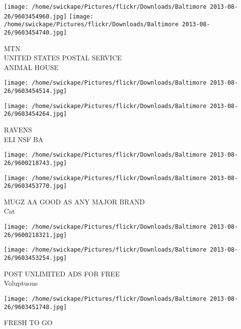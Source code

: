\documentclass[10pt,letterpaper]{article}
\begin{document}
\vspace{0.25in}
\texttt{[image: /home/swickape/Pictures/flickr/Downloads/Baltimore 2013-08-26/9603454960.jpg]}
\texttt{[image: /home/swickape/Pictures/flickr/Downloads/Baltimore 2013-08-26/9603454740.jpg]}

MTN\\
UNITED STATES POSTAL SERVICE\\
ANIMAL HOUSE\\
\pagebreak

\texttt{[image: /home/swickape/Pictures/flickr/Downloads/Baltimore 2013-08-26/9603454514.jpg]}

\vspace{0.25in}
\texttt{[image: /home/swickape/Pictures/flickr/Downloads/Baltimore 2013-08-26/9603454264.jpg]}

RAVENS\\
ELI NSF BA\\
\pagebreak

\texttt{[image: /home/swickape/Pictures/flickr/Downloads/Baltimore 2013-08-26/9600218743.jpg]}

\vspace{0.25in}
\texttt{[image: /home/swickape/Pictures/flickr/Downloads/Baltimore 2013-08-26/9603453770.jpg]}

MUGZ AA GOOD AS ANY MAJOR BRAND\\
Cat\\
\pagebreak

\texttt{[image: /home/swickape/Pictures/flickr/Downloads/Baltimore 2013-08-26/9600218321.jpg]}

\vspace{0.25in}
\texttt{[image: /home/swickape/Pictures/flickr/Downloads/Baltimore 2013-08-26/9603453254.jpg]}

POST UNLIMITED ADS FOR FREE\\
Voluptuous\\
\pagebreak

\texttt{[image: /home/swickape/Pictures/flickr/Downloads/Baltimore 2013-08-26/9603451748.jpg]}

FRESH TO GO\\
\pagebreak
\end{document}
